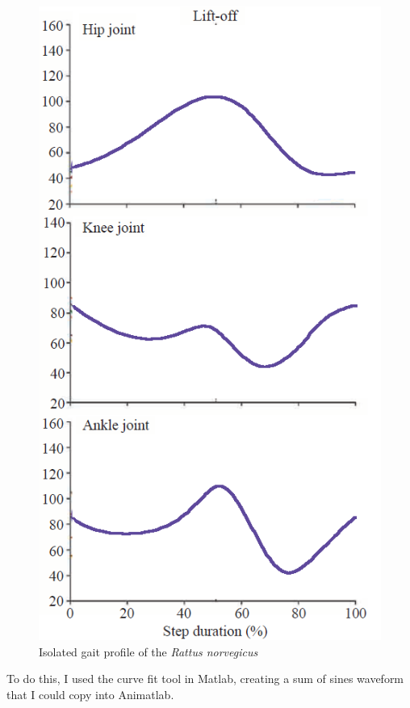 \documentclass[runningheads,a4paper]{llncs}
\begin{document}
\begin{figure}
\begin{minipage}{0.5\textwidth}
					\centering
					\includegraphics[width=\textwidth]{FischerAngles3.png}
					\caption{Isolated gait profile of the \textit{Rattus norvegicus}}
				\end{minipage}
			\end{figure}
	To do this, I used the curve fit tool in Matlab, creating a sum of sines waveform that I could copy into Animatlab. \par
\end{document}

